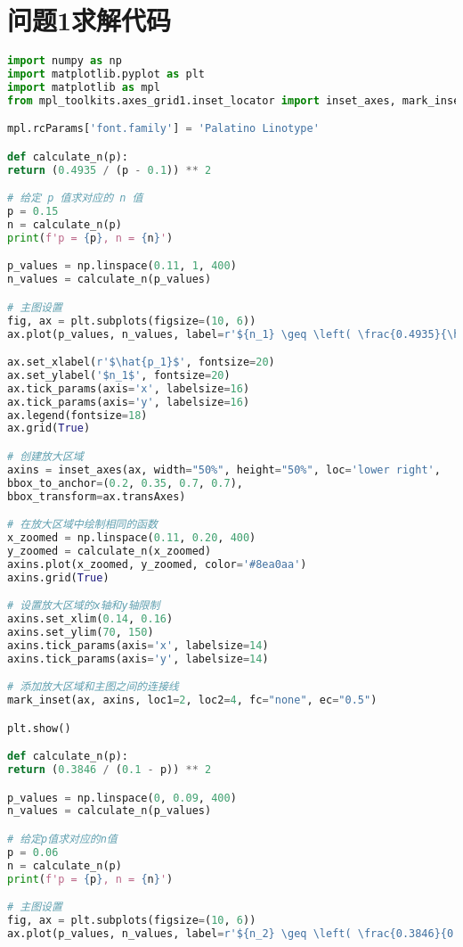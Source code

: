 \documentclass[withoutpreface,bwprint]{cumcmthesis} %
\begin{document}
\section{问题1求解代码}
\begin{lstlisting}[language=python]
import numpy as np
import matplotlib.pyplot as plt
import matplotlib as mpl
from mpl_toolkits.axes_grid1.inset_locator import inset_axes, mark_inset

mpl.rcParams['font.family'] = 'Palatino Linotype'

def calculate_n(p):
return (0.4935 / (p - 0.1)) ** 2

# 给定 p 值求对应的 n 值
p = 0.15
n = calculate_n(p)
print(f'p = {p}, n = {n}')

p_values = np.linspace(0.11, 1, 400)
n_values = calculate_n(p_values)

# 主图设置
fig, ax = plt.subplots(figsize=(10, 6))
ax.plot(p_values, n_values, label=r'${n_1} \geq \left( \frac{0.4935}{\hat{p_1} - 0.1} \right)^2$', color='#708194')

ax.set_xlabel(r'$\hat{p_1}$', fontsize=20)
ax.set_ylabel('$n_1$', fontsize=20)
ax.tick_params(axis='x', labelsize=16)
ax.tick_params(axis='y', labelsize=16)
ax.legend(fontsize=18)
ax.grid(True)

# 创建放大区域
axins = inset_axes(ax, width="50%", height="50%", loc='lower right',
bbox_to_anchor=(0.2, 0.35, 0.7, 0.7),
bbox_transform=ax.transAxes)

# 在放大区域中绘制相同的函数
x_zoomed = np.linspace(0.11, 0.20, 400)
y_zoomed = calculate_n(x_zoomed)
axins.plot(x_zoomed, y_zoomed, color='#8ea0aa')
axins.grid(True)

# 设置放大区域的x轴和y轴限制
axins.set_xlim(0.14, 0.16)
axins.set_ylim(70, 150)
axins.tick_params(axis='x', labelsize=14)
axins.tick_params(axis='y', labelsize=14)

# 添加放大区域和主图之间的连接线
mark_inset(ax, axins, loc1=2, loc2=4, fc="none", ec="0.5")

plt.show()

def calculate_n(p):
return (0.3846 / (0.1 - p)) ** 2

p_values = np.linspace(0, 0.09, 400)
n_values = calculate_n(p_values)

# 给定p值求对应的n值
p = 0.06
n = calculate_n(p)
print(f'p = {p}, n = {n}')

# 主图设置
fig, ax = plt.subplots(figsize=(10, 6))
ax.plot(p_values, n_values, label=r'${n_2} \geq \left( \frac{0.3846}{0.1 - \hat{p_2}} \right)^2$', color='#708194')


\end{lstlisting}
\end{document}
